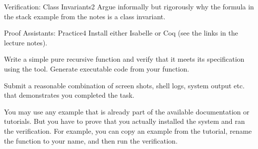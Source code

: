 \documentclass[a4paper]{article}
\begin{document}
\header

\begin{problem}{Verification: Class Invariants}{2}
Argue informally but rigorously why the formula in the stack example from the notes is a class invariant.
\end{problem}

%
%

\begin{problem}{Proof Assistants: Practice}{4}
Install either Isabelle or Coq (see the links in the lecture notes).

Write a simple pure recursive function and verify that it meets its specification using the tool.
Generate executable code from your function.
\medskip

Submit a reasonable combination of screen shots, shell logs, system output etc. that demonstrates you completed the task.

You may use any example that is already part of the available documentation or tutorials.
But you have to prove that you actually installed the system and ran the verification.
For example, you can copy an example from the tutorial, rename the function to your name, and then run the verification.
\end{problem}
\end{document}
